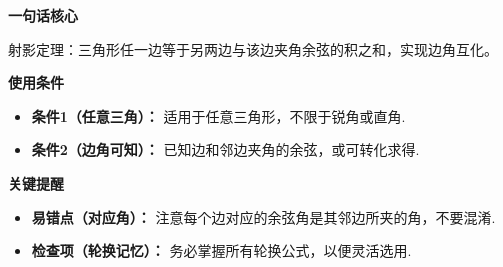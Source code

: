 \begin{summarybox}
	\textbf{\textcolor{CSummary}{一句话核心}}

	射影定理：三角形任一边等于另两边与该边夹角余弦的积之和，实现边角互化。

	\medskip
	\textbf{\textcolor{CSummary}{使用条件}}
	\begin{itemize}[leftmargin=*, itemsep=0.5em, topsep=0.4em]
		\item \textbf{条件1（任意三角）：} 适用于任意三角形，不限于锐角或直角.
		\item \textbf{条件2（边角可知）：} 已知边和邻边夹角的余弦，或可转化求得.
	\end{itemize}

	\medskip
	\textbf{\textcolor{CSummary}{关键提醒}}
	\begin{itemize}[leftmargin=*, itemsep=0.5em, topsep=0.4em]
		\item \textbf{易错点（对应角）：} 注意每个边对应的余弦角是其邻边所夹的角，不要混淆.
		\item \textbf{检查项（轮换记忆）：} 务必掌握所有轮换公式，以便灵活选用.
	\end{itemize}
\end{summarybox}
